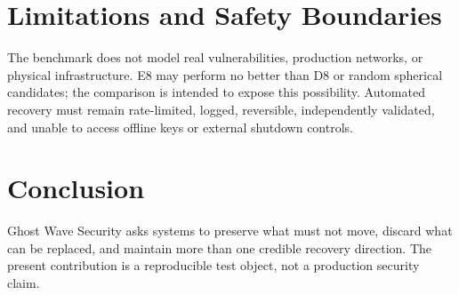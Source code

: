 \documentclass{article}
\begin{document}
\section{Limitations and Safety Boundaries}
The benchmark does not model real vulnerabilities, production networks, or physical infrastructure. E8 may perform no better than D8 or random spherical candidates; the comparison is intended to expose this possibility. Automated recovery must remain rate-limited, logged, reversible, independently validated, and unable to access offline keys or external shutdown controls.

\section{Conclusion}
Ghost Wave Security asks systems to preserve what must not move, discard what can be replaced, and maintain more than one credible recovery direction. The present contribution is a reproducible test object, not a production security claim.



\end{document}
